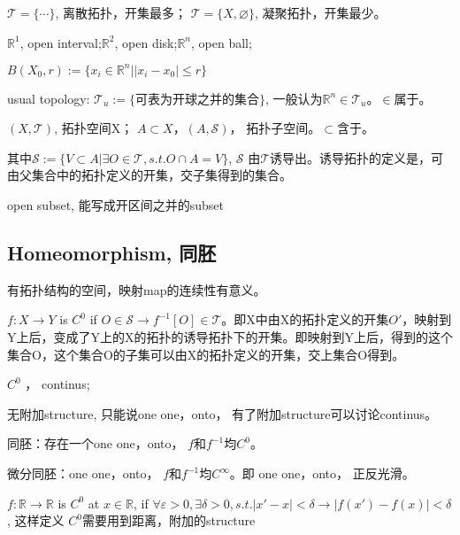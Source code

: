 $\mathscr T = \{ \cdots \}$, 离散拓扑，开集最多；
$\mathscr T = \{ X, \varnothing \}$, 凝聚拓扑，开集最少。

$\mathbb{R}^1$, open interval;$\mathbb{R}^2$, open disk;$\mathbb{R}^n$, open ball;

$B(X_0, r) := \{ x_i \in \mathbb{R}^n |   |x_i - x_0| \leq r\}$

usual topology: $\mathscr T_u := \{ \mbox{可表为开球之并的集合}\}$, 一般认为$\mathbb{R}^n \in \mathscr T_u $。$\in$属于。

$(X, \mathscr T)$, 拓扑空间X；
$A \subset X， (A, \mathscr S)$， 拓扑子空间。$ \subset $含于。

其中$\mathscr S := \{  V \subset A | \exists O \in \mathscr T, s.t. O \cap A = V\}$, $\mathscr S$ 由$\mathscr T$诱导出。诱导拓扑的定义是，可由父集合中的拓扑定义的开集，交子集得到的集合。

open subset, 能写成开区间之并的subset 


\subsection{Homeomorphism, 同胚}

有拓扑结构的空间，映射map的连续性有意义。

$f:X \to Y$ is $C^0$ if $ O \in \mathscr S \rightarrow f^{-1}[O] \in \mathscr T$。即X中由X的拓扑定义的开集$O'$，映射到Y上后，变成了Y上的X的拓扑的诱导拓扑下的开集。即映射到Y上后，得到的这个集合O，这个集合O的子集可以由X的拓扑定义的开集，交上集合O得到。

$C^0$ ， continus; 


无附加structure, 只能说one one，onto， 有了附加structure可以讨论continus。

同胚：存在一个one one，onto， $f$和$f^{-1}$均$C^0$。

微分同胚：one one，onto， $f$和$f^{-1}$均$C^\infty$。即 one one，onto， 正反光滑。

$f: \mathbb{R} \to \mathbb{R} $ is $C^0$ at $x\in  \mathbb{R}$, if $\forall \varepsilon >0, \exists \delta >0, s.t. |x' - x| < \delta \rightarrow |f(x') - f(x)| <   \delta$, 这样定义 $C^0$需要用到距离，附加的structure

